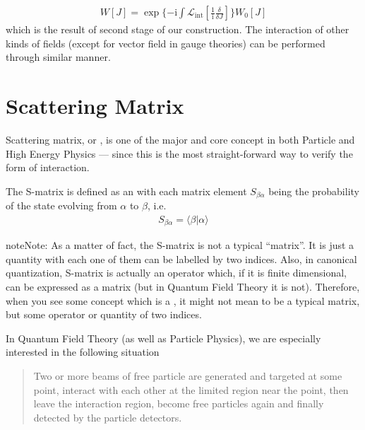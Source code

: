 \documentclass[letterpaper,10pt,english]{sphinxmanual}
\begin{document}
\begin{equation*}
\begin{split}W[J] = \exp\{-\mathrm{i}\int\mathcal{L}_{\text{int}}\!\!\left[\frac{1}{\mathrm{i}}\!\frac{\delta}{\delta J}\right]\} W_0[J]\end{split}
\end{equation*}
which is the result of second stage of our construction. The interaction of other kinds of fields (except for vector field in gauge theories) can be performed through similar manner.


\section{Scattering Matrix}
\label{\detokenize{qft_smatrix::doc}}\label{\detokenize{qft_smatrix:scattering-matrix}}
Scattering matrix, or , is one of the major and core concept in both Particle and High Energy Physics --- since this is the most straight-forward way to verify the form of interaction.

The S-matrix is defined as an  with each matrix element \(S_{\beta\alpha}\) being the probability of the state evolving from \(\alpha\) to \(\beta\), i.e.
\begin{equation*}
\begin{split}S_{\beta\alpha} = \langle\beta|\alpha\rangle\end{split}
\end{equation*}
\begin{sphinxadmonition}{note}{Note:}
As a matter of fact, the S-matrix is not a typical ``matrix''. It is just a quantity with each one of them can be labelled by two indices. Also, in canonical quantization, S-matrix is actually an operator which, if it is finite dimensional, can be expressed as a matrix (but in Quantum Field Theory it is not). Therefore, when you see some concept which is a , it might not mean to be a typical matrix, but some operator or quantity of two indices.
\end{sphinxadmonition}

In Quantum Field Theory (as well as Particle Physics), we are especially interested in the following situation
\begin{quote}

Two or more beams of free particle are generated and targeted at some point, interact with each other at the limited region near the point, then leave the interaction region, become free particles again and finally detected by the particle detectors.
\end{quote}
\end{document}
